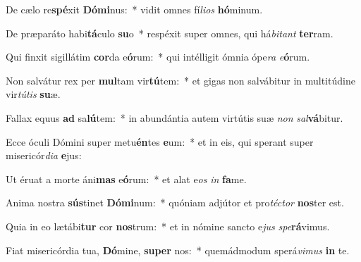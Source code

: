 \item De cælo re\textbf{spé}xit \textbf{Dó}\textbf{mi}nus:~* vidit omnes fí\textit{li}\textit{os} \textbf{hó}minum.
\item De præparáto habi\textbf{tá}culo \textbf{su}o~* respéxit super omnes, qui há\textit{bi}\textit{tant} \textbf{ter}ram.
\item Qui finxit sigillátim \textbf{cor}da e\textbf{ó}rum:~* qui intélligit ómnia ópe\textit{ra} \textit{e}\textbf{ó}rum.
\item Non salvátur rex per \textbf{mul}tam vir\textbf{tú}tem:~* et gigas non salvábitur in multitúdine vir\textit{tú}\textit{tis} \textbf{su}æ.
\item Fallax equus \textbf{ad} sa\textbf{lú}tem:~* in abundántia autem virtútis suæ \textit{non} \textit{sal}\textbf{vá}bitur.
\item Ecce óculi Dómini super metu\textbf{én}tes \textbf{e}um:~* et in eis, qui sperant super misericór\textit{di}\textit{a} \textbf{e}jus:
\item Ut éruat a morte áni\textbf{mas} e\textbf{ó}rum:~* et alat e\textit{os} \textit{in} \textbf{fa}me.
\item Anima nostra \textbf{sús}tinet \textbf{Dó}\textbf{mi}num:~* quóniam adjútor et pro\textit{téc}\textit{tor} \textbf{nos}ter est.
\item Quia in eo lætábi\textbf{tur} cor \textbf{nos}trum:~* et in nómine sancto e\textit{jus} \textit{spe}\textbf{rá}vimus.
\item Fiat misericórdia tua, \textbf{Dó}mine, \textbf{su}\textbf{per} nos:~* quemádmodum sperá\textit{vi}\textit{mus} \textbf{in} te.
